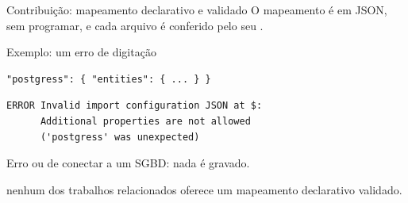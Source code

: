 \begin{frame}[fragile,label=esquemas]{Contribuição: mapeamento declarativo e validado}
  \begingroup\small O mapeamento é  em JSON, sem programar, e cada
  arquivo é conferido pelo seu .\par
  \endgroup
  \smallskip
  \begingroup\footnotesize{}
  \centering
  \begin{minipage}[t]{0.62\textwidth}\vspace{0pt}
    \begin{painel}{Exemplo: um erro de digitação}{}
\begin{lstlisting}[style=jsonslide, aboveskip=0pt, belowskip=2pt]
"postgress": { "entities": { ... } }
\end{lstlisting}
\begin{lstlisting}[style=bashslide, aboveskip=0pt, belowskip=0pt, basicstyle=\ttfamily\scriptsize\color{red!55!black}]
ERROR Invalid import configuration JSON at $:
      Additional properties are not allowed
      ('postgress' was unexpected)
\end{lstlisting}
      \smallskip
      Erro  ou de conectar a um SGBD:
      nada é gravado.
    \end{painel}
  \end{minipage}\par
  \endgroup
  \vfill
  \begin{tcolorbox}[colback=ufscfundo, colframe=ufscazul, sharp corners, boxrule=0pt,
      leftrule=1mm, left=2mm, right=2mm, top=1mm, bottom=1mm, boxsep=0pt]
    \footnotesize
     nenhum dos trabalhos relacionados oferece um mapeamento
    declarativo validado.
  \end{tcolorbox}
\end{frame}

